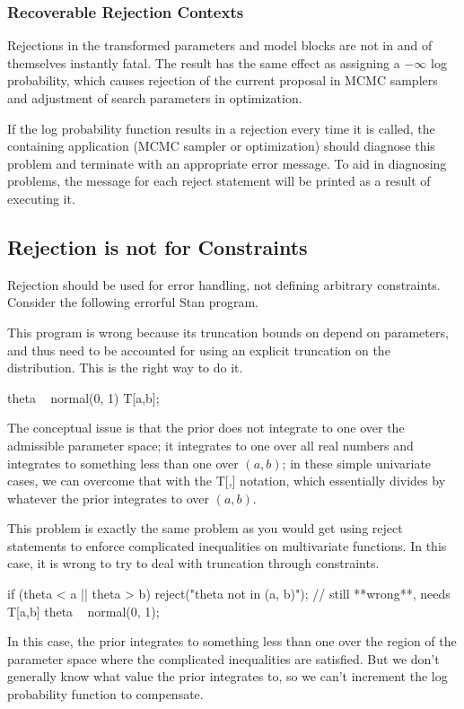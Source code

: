 \subsubsection{Recoverable Rejection Contexts}

Rejections in the transformed parameters and model blocks are
not in and of themselves instantly fatal.  The result has the same
effect as assigning a $-\infty$ log probability, which causes
rejection of the current proposal in MCMC samplers and adjustment of
search parameters in optimization.

If the log probability function results in a rejection every time it is
called, the containing application (MCMC sampler or optimization)
should diagnose this problem and terminate with an appropriate error
message.  To aid in diagnosing problems, the message for each
reject statement will be printed as a result of executing it.


\subsection{Rejection is not for Constraints}

Rejection should be used for error handling, not defining arbitrary
constraints.  Consider the following errorful Stan program.
%
\begin{stancode}
parameters {
  real a;
  real<lower=a> b;
  real<lower=a, upper=b> theta;
  ...
model {
  // **wrong** needs explicit truncation
  theta ~ normal(0, 1); 
  ...
\end{stancode}
%
This program is wrong because its truncation bounds on 
depend on parameters, and thus need to be accounted for using an
explicit truncation on the distribution.  This is the right way to do
it.  
%
\begin{stancode}
  theta ~ normal(0, 1) T[a,b];
\end{stancode}
%
The conceptual issue is that the prior does not integrate to one over
the admissible parameter space; it integrates to one over all real
numbers and integrates to something less than one over $(a,b)$; in these
simple univariate cases, we can overcome that with the T[,] notation,
which essentially divides by whatever the prior integrates to over
$(a,b)$.  

This problem is exactly the same problem as you would get using reject
statements to enforce complicated inequalities on multivariate
functions.  In this case, it is wrong to try to deal with truncation
through constraints.
%
\begin{stancode}
  if (theta < a || theta > b)
    reject("theta not in (a, b)");
  // still **wrong**, needs T[a,b]
  theta ~ normal(0, 1);
\end{stancode} 
%
In this case, the prior integrates to something less than one over the
region of the parameter space where the complicated inequalities are
satisfied. But we don't generally know what value the prior integrates
to, so we can't increment the log probability function to compensate.

